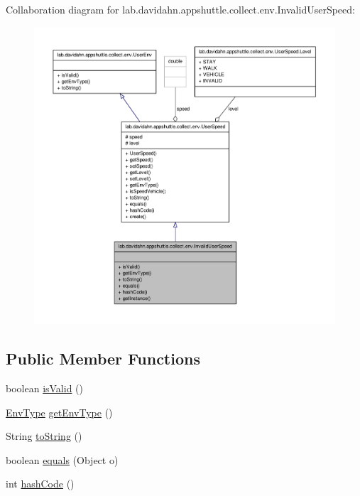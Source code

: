 \-Collaboration diagram for lab.\-davidahn.\-appshuttle.\-collect.\-env.\-Invalid\-User\-Speed\-:
\nopagebreak
\begin{figure}[H]
\begin{center}
\leavevmode
\includegraphics[width=350pt]{classlab_1_1davidahn_1_1appshuttle_1_1collect_1_1env_1_1_invalid_user_speed__coll__graph}
\end{center}
\end{figure}
\subsection*{\-Public \-Member \-Functions}
\begin{DoxyCompactItemize}
\item 
boolean \hyperlink{classlab_1_1davidahn_1_1appshuttle_1_1collect_1_1env_1_1_invalid_user_speed_ab8e58ba65532c4f1a3c5cfc30a233b40}{is\-Valid} ()
\item 
\hyperlink{enumlab_1_1davidahn_1_1appshuttle_1_1collect_1_1env_1_1_env_type}{\-Env\-Type} \hyperlink{classlab_1_1davidahn_1_1appshuttle_1_1collect_1_1env_1_1_invalid_user_speed_a3d1110c5b44039e55b1ca9cebcfc95a7}{get\-Env\-Type} ()
\item 
\-String \hyperlink{classlab_1_1davidahn_1_1appshuttle_1_1collect_1_1env_1_1_invalid_user_speed_a94a9655c9630dfc6c75536fa49cddf94}{to\-String} ()
\item 
boolean \hyperlink{classlab_1_1davidahn_1_1appshuttle_1_1collect_1_1env_1_1_invalid_user_speed_aec2528698d5e4b9bf1b34f7ec8eaa384}{equals} (\-Object o)
\item 
int \hyperlink{classlab_1_1davidahn_1_1appshuttle_1_1collect_1_1env_1_1_invalid_user_speed_a79ba635ed4d2ea1eee670156d4f1c3db}{hash\-Code} ()
\end{DoxyCompactItemize}
